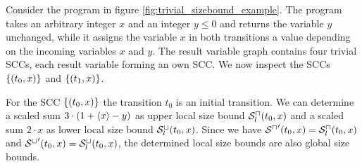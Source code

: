 \begin{example}
  
  Consider the program in figure \ref{fig:trivial_sizebound_example}.
  The program takes an arbitrary integer $x$ and an integer $y \leq 0$ and returns the variable $y$ unchanged, while it assigns the variable $x$ in both transitions a value depending on the incoming variables $x$ and $y$.
  The result variable graph contains four trivial SCCs, each result variable forming an own SCC.
  We now inspect the SCCs $\lbrace (t_0,x) \rbrace$ and $\lbrace (t_1,x) \rbrace$.
  
  For the SCC $\lbrace (t_0,x) \rbrace$ the transition $t_0$ is an initial transition.
  We can determine a scaled sum $3 \cdot (1 + \langle x\rangle - y)$ as upper local size bound ${\mathcal{S}^\sqcap_l}(t_0,x)$ and a scaled sum $2 \cdot x$ as lower local size bound ${\mathcal{S}^\sqcup_l}(t_0,x)$.
  Since we have ${\mathcal{S}^\sqcap}'(t_0,x) = {\mathcal{S}^\sqcap_l}(t_0,x)$ and ${\mathcal{S}^\sqcup}'(t_0,x) = {\mathcal{S}^\sqcup_l}(t_0,x)$, the determined local size bounds are also global size bounds.
  

\end{example}
